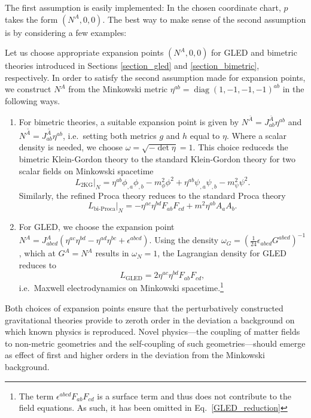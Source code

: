 The first assumption is easily implemented: In the chosen coordinate chart, $p$ takes the form $(N^A,0,0)$. The best way to make sense of the second assumption is by considering a few examples:
\begin{example}\label{example_expansion_points}
  Let us choose appropriate expansion points $(N^A,0,0)$ for GLED and bimetric theories introduced in Sections \ref{section_gled} and \ref{section_bimetric}, respectively. In order to satisfy the second assumption made for expansion points, we construct $N^A$ from the Minkowski metric $\eta^{ab} = \operatorname{diag}(1,-1,-1,-1)^{ab}$ in the following ways.
  \begin{enumerate}
    \item{For bimetric theories, a suitable expansion point is given by $N^{\bar A} = J_{ab}^{\bar A} \eta^{ab}$ and $N^{\bar{\bar A}} = J_{ab}^{\bar{\bar A}} \eta^{ab}$, i.e.~setting both metrics $g$ and $h$ equal to $\eta$. Where a scalar density is needed, we choose $\omega = \sqrt{-\operatorname{det}\eta} = 1$. This choice reduceds the bimetric Klein-Gordon theory to the standard Klein-Gordon theory for two scalar fields on Minkowski spacetime
      \begin{equation}
        L_\text{2KG}\big\rvert_N = \eta^{ab} \phi_{,a} \phi_{,b} - m_\phi^2\phi^2 + \eta^{ab} \psi_{,a} \psi_{,b} - m_\psi^2\psi^2.
      \end{equation}
    Similarly, the refined Proca theory reduces to the standard Proca theory
      \begin{equation}
        L_\text{bi-Proca}\big\rvert_N = -\eta^{ac}\eta^{bd}F_{ab}F_{cd} + m^2\eta^{ab}A_aA_b.
      \end{equation}}
    \item{For GLED, we choose the expansion point $N^A = J_{abcd}^A (\eta^{ac} \eta^{bd} - \eta^{ad} \eta^{bc} + \epsilon^{abcd})$. Using the density $\omega_G = (\frac{1}{24}\epsilon_{abcd}G^{abcd})^{-1}$, which at $G^A=N^A$ results in $\omega_N = 1$, the Lagrangian density for GLED reduces to
        \begin{equation}\label{GLED_reduction}
        L_\text{GLED} = 2 \eta^{ac}\eta^{bd} F_{ab}F_{cd},
      \end{equation}
    i.e.~Maxwell electrodynamics on Minkowski spacetime.\footnote{The term $\epsilon^{abcd}F_{ab}F_{cd}$ is a surface term and thus does not contribute to the field equations. As such, it has been omitted in Eq.~\ref{GLED_reduction}}}
  \end{enumerate}
\end{example}
Both choices of expansion points ensure that the perturbatively constructed gravitational theories provide to zeroth order in the deviation a background on which known physics is reproduced. Novel physics---the coupling of matter fields to non-metric geometries and the self-coupling of such geometries---should emerge as effect of first and higher orders in the deviation from the Minkowski background.

